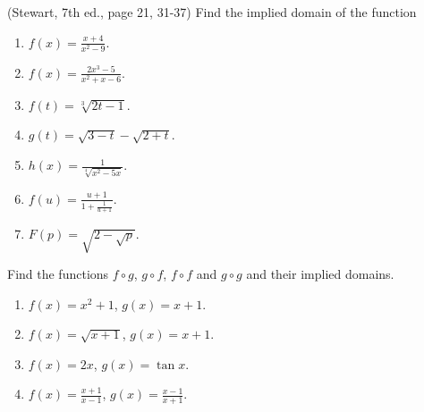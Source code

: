 \begin{problem}(Stewart, 7th ed., page 21, 31-37) Find the implied domain of the function
\begin{multicols}{2}
\begin{enumerate}
\item $f(x)=\frac{x+4}{x^2-9}$.
\item $f(x)=\frac{2x^3-5}{x^2+x-6}$.
\item $f(t)=\sqrt[3]{2t-1}$.
\item $g(t)=\sqrt{3-t}-\sqrt{2+t}$.
\item $h(x)=\frac{1}{\sqrt[4]{x^2-5x}}$.
\item $f(u)=\frac{u+1}{1+\frac{1}{u+1}}$.
\item $F(p)=\sqrt{2-{\sqrt{p}}}$.
\end{enumerate}
\end{multicols}
\end{problem}
\begin{problem} Find the functions $f\circ g$, $g\circ f$, $f\circ f$ and $g\circ g$ and their implied domains.

\begin{enumerate}
\item $f(x)=x^2+1$, $g(x)=x+1$. 
\item $f(x)=\sqrt{x+1}$, $g(x)=x+1$. 
\item $f(x)= 2x$, $g(x)= \tan x$.
\item $f(x)=\frac{x+1}{x-1}$, $g(x)=\frac{x-1}{x+1}$.
\end{enumerate}
\end{problem}
